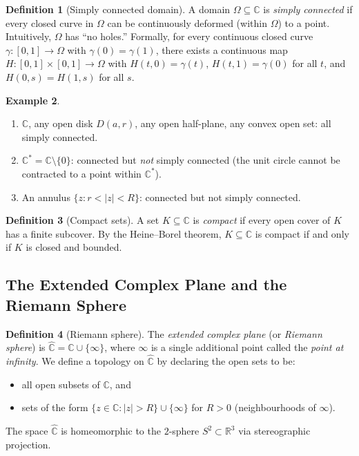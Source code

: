 \documentclass[12pt,a4paper,openany]{book}
\theoremstyle{definition}
\newtheorem{definition}{Definition}[chapter]
\newtheorem{example}[definition]{Example}
\theoremstyle{plain}
\theoremstyle{remark}
\newcommand{\C}{\mathbb{C}}
\newcommand{\R}{\mathbb{R}}
\newcommand{\abs}[1]{\left|#1\right|}
\begin{document}
\begin{definition}[Simply connected domain]
\label{def:simply-connected}
A domain $\Omega\subseteq\C$ is \emph{simply connected} if every closed curve in $\Omega$ can be continuously deformed (within $\Omega$) to a point. Intuitively, $\Omega$ has ``no holes.'' Formally, for every continuous closed curve $\gamma:[0,1]\to\Omega$ with $\gamma(0)=\gamma(1)$, there exists a continuous map $H:[0,1]\times[0,1]\to\Omega$ with $H(t,0)=\gamma(t)$, $H(t,1)=\gamma(0)$ for all $t$, and $H(0,s)=H(1,s)$ for all $s$.
\end{definition}

\begin{example}
\leavevmode
\begin{enumerate}[label=\textup{(\roman*)}]
  \item $\C$, any open disk $D(a,r)$, any open half-plane, any convex open set: all simply connected.
  \item $\C^* = \C\setminus\{0\}$: connected but \emph{not} simply connected (the unit circle cannot be contracted to a point within $\C^*$).
  \item An annulus $\{z: r<\abs{z}<R\}$: connected but not simply connected.
\end{enumerate}
\end{example}

\begin{definition}[Compact sets]
\label{def:compact}
A set $K\subseteq\C$ is \emph{compact} if every open cover of $K$ has a finite subcover. By the Heine--Borel theorem, $K\subseteq\C$ is compact if and only if $K$ is closed and bounded.
\end{definition}

\subsection{The Extended Complex Plane and the Riemann Sphere}
\label{subsec:riemann-sphere}

\begin{definition}[Riemann sphere]
\label{def:riemann-sphere}
The \emph{extended complex plane} (or \emph{Riemann sphere}) is $\hat{\C} = \C\cup\{\infty\}$, where $\infty$ is a single additional point called the \emph{point at infinity}. We define a topology on $\hat{\C}$ by declaring the open sets to be:
\begin{itemize}
  \item all open subsets of $\C$, and
  \item sets of the form $\{z\in\C:\abs{z}>R\}\cup\{\infty\}$ for $R>0$ (neighbourhoods of $\infty$).
\end{itemize}
The space $\hat{\C}$ is homeomorphic to the $2$-sphere $S^2\subset\R^3$ via stereographic projection.
\end{definition}
\end{document}

